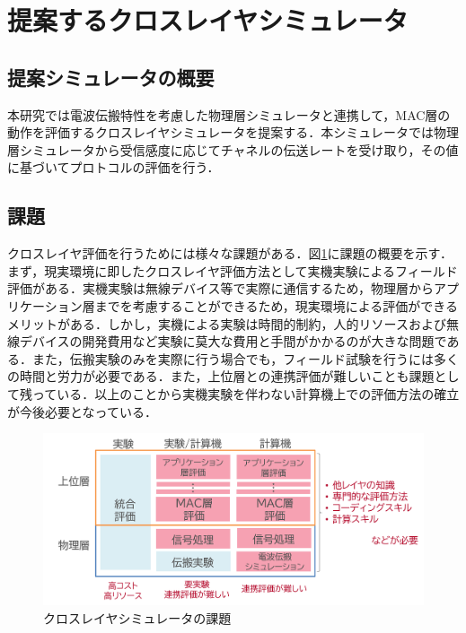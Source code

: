 \documentclass[a4paper,10pt]{ltjsarticle}
\begin{document}

\clearpage
\section{提案するクロスレイヤシミュレータ}
\subsection{提案シミュレータの概要}
本研究では電波伝搬特性を考慮した物理層シミュレータと連携して，MAC層の動作を評価するクロスレイヤシミュレータを提案する．本シミュレータでは物理層シミュレータから受信感度に応じてチャネルの伝送レートを受け取り，その値に基づいてプロトコルの評価を行う．




\subsection{課題}

クロスレイヤ評価を行うためには様々な課題がある．図\ref{fig:problem}に課題の概要を示す．まず，現実環境に即したクロスレイヤ評価方法として実機実験によるフィールド評価がある．実機実験は無線デバイス等で実際に通信するため，物理層からアプリケーション層までを考慮することができるため，現実環境による評価ができるメリットがある．しかし，実機による実験は時間的制約，人的リソースおよび無線デバイスの開発費用など実験に莫大な費用と手間がかかるのが大きな問題である．また，伝搬実験のみを実際に行う場合でも，フィールド試験を行うには多くの時間と労力が必要である．また，上位層との連携評価が難しいことも課題として残っている．以上のことから実機実験を伴わない計算機上での評価方法の確立が今後必要となっている\cite{book2}．

\begin{figure}[H]
  \centering
  \includegraphics[width=\textwidth]{./assets/課題.png}
  \caption{クロスレイヤシミュレータの課題}
  \label{fig:problem}
\end{figure}
\end{document}
